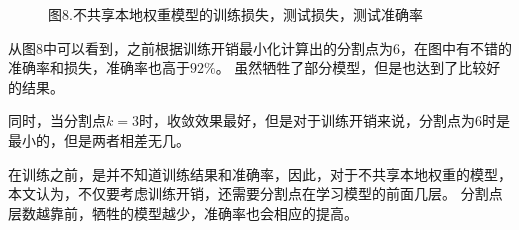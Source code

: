 \documentclass{article}
\begin{document}
\begin{figure}[H]
    \centering
    \caption*{图8.不共享本地权重模型的训练损失，测试损失，测试准确率}
\end{figure}

从图8中可以看到，之前根据训练开销最小化计算出的分割点为$6$，在图中有不错的准确率和损失，准确率也高于$92\%$。
虽然牺牲了部分模型，但是也达到了比较好的结果。

同时，当分割点$k=3$时，收敛效果最好，但是对于训练开销来说，分割点为$6$时是最小的，但是两者相差无几。

在训练之前，是并不知道训练结果和准确率，因此，对于不共享本地权重的模型，本文认为，不仅要考虑训练开销，还需要分割点在学习模型的前面几层。
分割点层数越靠前，牺牲的模型越少，准确率也会相应的提高。
\end{document}
